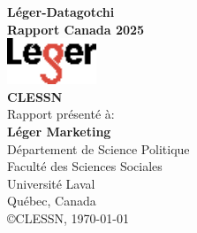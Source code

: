 \documentclass[
  letterpaper,
  DIV=11,
  numbers=noendperiod]{scrartcl}
\author{}
\date{}
\begin{document}
\begin{titlepage}
  \newfontfamily{}


  \begin{center}
    \null{} %
    {\titlepagefont\fontsize{48pt}{18pt}\selectfont \textbf{Léger-Datagotchi}}\\[1cm]
    {\titlepagefont\fontsize{32pt}{18pt}\selectfont \textbf{Rapport Canada 2025}}\\[1cm]
    \includegraphics[width=0.2\textwidth]{img/leger_small.png}\\[1cm]
    {\titlepagefont\fontsize{32pt}{16pt}\selectfont \textbf{CLESSN}}\\[1cm]
    {\titlepagefont\fontsize{16pt}{14pt}\selectfont Rapport présenté à:}\\ %
    {\titlepagefont\fontsize{24pt}{16pt}\selectfont \textbf{Léger Marketing}}\\[1.5cm]
    {\titlepagefont\fontsize{16pt}{14pt}\selectfont Département de Science Politique\\Faculté des Sciences Sociales\\Université Laval}\\[2.5cm]
    {\titlepagefont\fontsize{16pt}{14pt}\selectfont Québec, Canada}\\[2cm]
    {\titlepagefont\fontsize{12pt}{12pt}\selectfont \copyright \thinspace CLESSN, \today}\\
    \null{} %
  \end{center}  \thispagestyle{empty} %
  \clearpage %
\end{titlepage}
\end{document}
